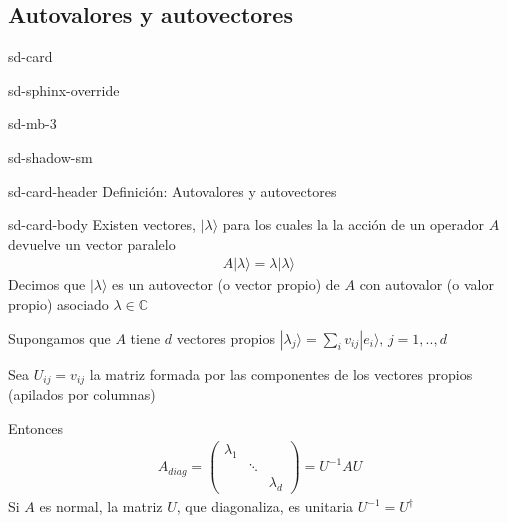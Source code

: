 \documentclass[letterpaper,10pt,english]{jupyterBook}
\newcommand{\ket}[1]{|#1\rangle}
\begin{document}
\subsection{Autovalores y autovectores}
\label{\detokenize{docs/Part_01_Formalismo/Chapter_01_02_Formalismo_matem_xe1tico/01_03_Operadores_myst:autovalores-y-autovectores}}
\begin{sphinxuseclass}{sd-card}
\begin{sphinxuseclass}{sd-sphinx-override}
\begin{sphinxuseclass}{sd-mb-3}
\begin{sphinxuseclass}{sd-shadow-sm}
\begin{sphinxuseclass}{sd-card-header}
\sphinxAtStartPar
Definición: Autovalores y autovectores

\end{sphinxuseclass}
\begin{sphinxuseclass}{sd-card-body}
\sphinxAtStartPar
Existen vectores, \(\ket{\lambda}\) para los cuales la la acción de un operador \(A\) devuelve un vector paralelo
\begin{equation*}
\begin{split}
A\ket{\lambda} = \lambda \ket{\lambda}\, 
\end{split}
\end{equation*}
\sphinxAtStartPar
Decimos que \(\ket{\lambda}\) es un autovector (o vector propio) de \(A\) con autovalor (o valor propio) asociado \(\lambda\in {\mathbb C}\)

\end{sphinxuseclass}
\end{sphinxuseclass}
\end{sphinxuseclass}
\end{sphinxuseclass}
\end{sphinxuseclass}
\sphinxAtStartPar
Supongamos que \(A\) tiene \(d\) vectores propios \(\ket{\lambda_j} = \sum_i v_{ij}\ket{e_i}, \, j=1,..,d\)

\sphinxAtStartPar
Sea \(U_{ij} = v_{ij}\) la matriz formada por las componentes de los vectores propios (apilados por columnas)

\sphinxAtStartPar
Entonces
\begin{equation*}
\begin{split}
A_{diag} = \begin{pmatrix} \lambda_1 & & \\ & \ddots & \\ & & \lambda_d \end{pmatrix} = U^{-1} A U
\end{split}
\end{equation*}
\sphinxAtStartPar
Si \(A\) es normal, la matriz \(U\), que diagonaliza, es unitaria \(U^{-1} = U^{\dagger}\)
\end{document}
